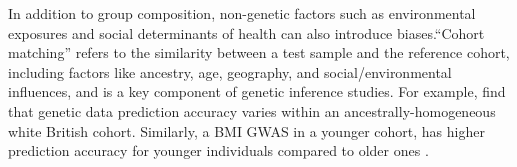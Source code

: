 In addition to group composition, non-genetic factors such as environmental exposures and social determinants of health can also introduce biases.``Cohort matching'' refers to the similarity between a test sample and the reference cohort, including factors like ancestry, age, geography, and social/environmental influences, and is a key component of genetic inference studies. For example, \cite{mostafavi_variable_2020} find that genetic data prediction accuracy varies within an ancestrally-homogeneous white British cohort. Similarly, a BMI GWAS in a younger cohort, has higher prediction accuracy for younger individuals compared to older ones .
